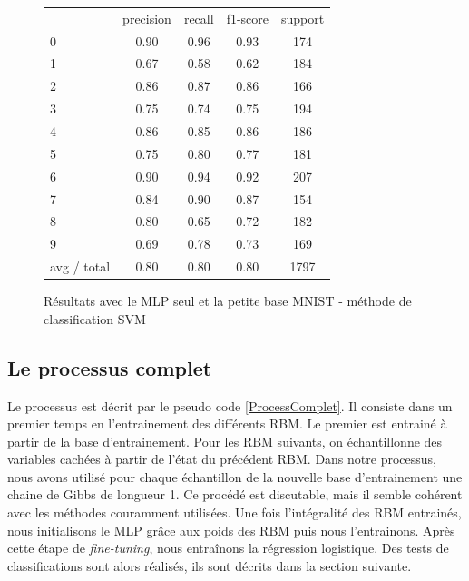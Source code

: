 \documentclass[10pt,a4paper]{article}
\begin{document}
\begin{figure}[ht!]
\centering
\begin{tabular}{l|c|c|c|c}
           &  precision  &  recall & f1-score  & support \\
          0 &      0.90 &     0.96 &     0.93&       174 \\
          1  &     0.67  &    0.58  &    0.62 &      184\\
          2   &    0.86   &   0.87   &   0.86  &     166\\
          3    &   0.75    &  0.74    &  0.75   &    194\\
          4     &  0.86     & 0.85     & 0.86    &   186\\
          5      & 0.75      &0.80      &0.77     &  181\\
          6 &      0.90&      0.94&      0.92      & 207\\
          7  &     0.84 &     0.90  &    0.87&       154\\
          8   &    0.80  &    0.65   &   0.72 &      182\\
          9    &   0.69   &   0.78    &  0.73  &     169\\
avg / total     &  0.80    &  0.80     & 0.80   &   1797
\end{tabular}
\caption{Résultats avec le MLP seul et la petite base MNIST - méthode de classification SVM}
\end{figure} 





\subsection{Le processus complet}


Le processus est décrit par le pseudo code \ref{ProcessComplet}. Il consiste dans un premier temps en l'entrainement des différents RBM. Le premier est entrainé à partir de la base d'entrainement. Pour les RBM suivants, on échantillonne des variables cachées à partir de l'état du précédent RBM. Dans notre processus, nous avons utilisé pour chaque échantillon de la nouvelle base d'entrainement une chaine de Gibbs de longueur 1. Ce procédé est discutable, mais il semble cohérent avec les méthodes couramment utilisées. Une fois l'intégralité des RBM entrainés, nous initialisons le MLP grâce aux poids des RBM puis nous l'entrainons. Après cette étape de \textit{fine-tuning}, nous entraînons la régression logistique. Des tests de classifications sont alors réalisés, ils sont décrits dans la section suivante.
\end{document}
